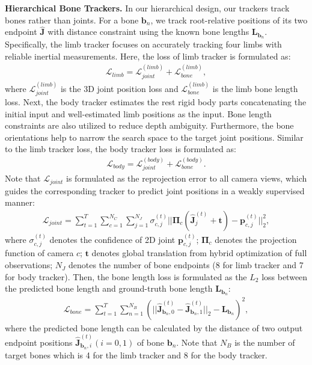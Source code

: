 \documentclass[letterpaper]{article} \usepackage{aaai23}  \usepackage{times}  \usepackage{helvet}  \usepackage{courier}  \usepackage[hyphens]{url}  \usepackage{graphicx} \urlstyle{rm} \def\UrlFont{\rm}  \usepackage{natbib}  \usepackage{caption} \frenchspacing  \setlength{\pdfpagewidth}{8.5in}  \setlength{\pdfpageheight}{11in}  \usepackage{algorithm}
\newcommand{\myparagraph}[1]{\vspace{0.1em}\noindent\textbf{#1}}
\begin{document}
\myparagraph{Hierarchical Bone Trackers.}
In our hierarchical design, our trackers track bones rather than joints. For a bone $\textbf{b}_n$, we track root-relative positions of its two endpoint $\mathbf{\hat{J}}$ with distance constraint using the known bone lengths $\mathbf{L}_{\textbf{b}_n}$. 
Specifically, the limb tracker focuses on accurately tracking four limbs with reliable inertial measurements. Here, the loss of limb tracker is formulated as:
\begin{align}
	\mathcal{L}_{limb} = \mathcal{L}_{joint}^{(limb)} + \mathcal{L}_{bone}^{(limb)},
\end{align}
where $\mathcal{L}_{joint}^{(limb)}$ is the 3D joint position loss and $\mathcal{L}_{bone}^{(limb)}$ is the limb bone length loss. 
Next, the body tracker estimates the rest rigid body parts concatenating the initial input and well-estimated limb positions as the input. Bone length constraints are also utilized to reduce depth ambiguity. Furthermore, the bone orientations help to narrow the search space to the target joint positions. Similar to the limb tracker loss, the body tracker loss is formulated as:
\begin{align}
	\mathcal{L}_{body} = \mathcal{L}_{joint}^{(body)} + \mathcal{L}_{bone}^{(body)}.
\end{align}
Note that $\mathcal{L}_{joint}$ is formulated as the reprojection error to all camera views, which guides the corresponding tracker to predict joint positions in a weakly supervised manner:
\begin{align}
	\mathcal{L}_{joint} = \sum_{t=1}^T \sum_{c=1}^{N_C} \sum_{j=1}^{N_J} \sigma_{c,j}^{(t)}||\mathbf{\Pi}_c(\mathbf{\hat{J}}_j^{(t)}+\textbf{t})  - \mathbf{p}_{c,j}^{(t)}||_2^2,
\end{align}
where $\sigma_{c,j}^{(t)}$ denotes the confidence of 2D joint $\mathbf{p}_{c,j}^{(t)}$; $\mathbf{\Pi}_c$ denotes the projection function of camera $c$; $\mathbf{t}$ denotes global translation from hybrid optimization of full observations; $N_J$ denotes the number of bone endpoints (8 for limb tracker and 7 for body tracker). 
Then, the bone length loss is formulated as the $L_2$ loss between the predicted bone length and ground-truth bone length $\mathbf{L}_{\textbf{b}_n}$:
\begin{align}
	\mathcal{L}_{bone} = \sum_{t=1}^T \sum_{n=1}^{N_B} (||\mathbf{\hat{J}}_{\textbf{b}_n, 0}^{(t)} - \mathbf{\hat{J}}_{\textbf{b}_n, 1}^{(t)}||_2 - \mathbf{L}_{\textbf{b}_n})^2,
\end{align}
where the predicted bone length can be calculated by the distance of two output endpoint positions $\mathbf{\hat{J}}_{\textbf{b}_n, i}^{(t)} (i=0,1)$ of bone $\textbf{b}_n$. Note that $N_B$ is the number of target bones which is 4 for the limb tracker and 8 for the body tracker.
\end{document}
